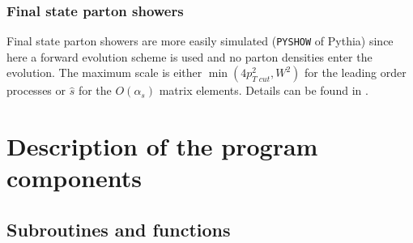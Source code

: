 \documentclass[10pt]{article} \usepackage{dina4}
\def\PYTHIA{{\sc Pythia}}
\begin{document}
\subsubsection{Final state parton showers}
Final state parton showers are more easily simulated (\verb+PYSHOW+
of \PYTHIA) since here a forward evolution scheme is used and no parton 
densities enter the evolution. The maximum scale is either
$\min (4 p_{T\;cut}^2,W^2)$ for the leading order processes or $\hat{s}$ for
the $O(\alpha_s)$ matrix elements. Details can be found in 
\cite{Jetsetc}.
\section{Description of the program components}

\subsection{Subroutines and functions}
\end{document}
